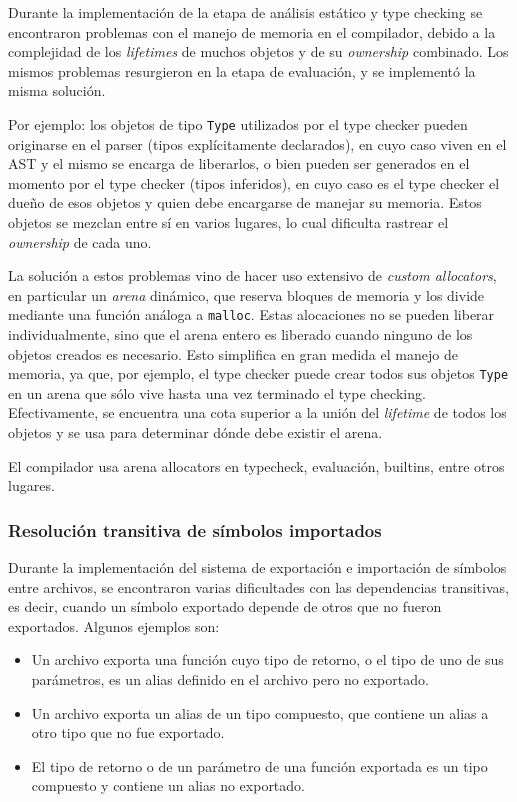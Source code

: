 Durante la implementación de la etapa de análisis estático y type checking se encontraron problemas con el manejo de memoria en el compilador, debido a la complejidad de los \textit{lifetimes} de muchos objetos y de su \textit{ownership} combinado. Los mismos problemas resurgieron en la etapa de evaluación, y se implementó la misma solución.

Por ejemplo: los objetos de tipo \texttt{Type} utilizados por el type checker pueden originarse en el parser (tipos explícitamente declarados), en cuyo caso viven en el AST y el mismo se encarga de liberarlos, o bien pueden ser generados en el momento por el type checker (tipos inferidos), en cuyo caso es el type checker el dueño de esos objetos y quien debe encargarse de manejar su memoria. Estos objetos se mezclan entre sí en varios lugares, lo cual dificulta rastrear el \textit{ownership} de cada uno.

La solución a estos problemas vino de hacer uso extensivo de \textit{custom allocators}, en particular un \textit{arena} dinámico, que reserva bloques de memoria y los divide mediante una función análoga a \texttt{malloc}. Estas alocaciones no se pueden liberar individualmente, sino que el arena entero es liberado cuando ninguno de los objetos creados es necesario. Esto simplifica en gran medida el manejo de memoria, ya que, por ejemplo, el type checker puede crear todos sus objetos \texttt{Type} en un arena que sólo vive hasta una vez terminado el type checking. Efectivamente, se encuentra una cota superior a la unión del \textit{lifetime} de todos los objetos y se usa para determinar dónde debe existir el arena.

El compilador usa arena allocators en typecheck, evaluación, builtins, entre otros lugares.

\subsubsection{Resolución transitiva de símbolos importados}

Durante la implementación del sistema de exportación e importación de símbolos entre archivos, se encontraron varias dificultades con las dependencias transitivas, es decir, cuando un símbolo exportado depende de otros que no fueron exportados. Algunos ejemplos son:

\begin{itemize}
	\item Un archivo exporta una función cuyo tipo de retorno, o el tipo de uno de sus parámetros, es un alias definido en el archivo pero no exportado.
	\item Un archivo exporta un alias de un tipo compuesto, que contiene un alias a otro tipo que no fue exportado.
	\item El tipo de retorno o de un parámetro de una función exportada es un tipo compuesto y contiene un alias no exportado.
\end{itemize}

